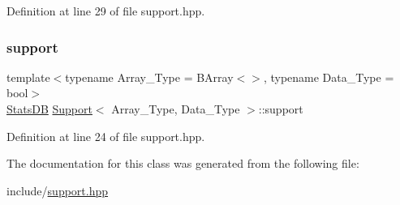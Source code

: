 Definition at line 29 of file support.\+hpp.

\mbox{\label{class_support_ab2f404c7c11d5bc58e876124cc52d073}} 
\subsubsection{\texorpdfstring{support}{support}}
{\footnotesize\ttfamily template$<$typename Array\+\_\+\+Type  = B\+Array$<$$>$, typename Data\+\_\+\+Type  = bool$>$ \\
\hyperlink{class_stats_d_b}{Stats\+DB} \hyperlink{class_support}{Support}$<$ Array\+\_\+\+Type, Data\+\_\+\+Type $>$\+::support}



Definition at line 24 of file support.\+hpp.



The documentation for this class was generated from the following file\+:\begin{DoxyCompactItemize}
\item 
include/\hyperlink{support_8hpp}{support.\+hpp}\end{DoxyCompactItemize}
